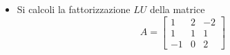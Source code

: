 \begin{itemize}
\item
Si calcoli la fattorizzazione $LU$ della matrice
\bigskip
\[
A=\left[
\begin{array}{ccc}
1 & 2 & -2 \\
1 & 1 & 1\\
-1 & 0 & 2
\end{array}\right]
\]
\end{itemize}
